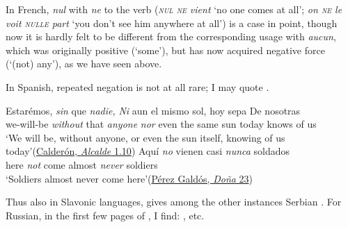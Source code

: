 In French, \textit{nul} with \textit{ne} to the verb (\textit{\textsc{nul ne} vient} `no one comes at all'; \textit{on \textsc{ne} le voit \textsc{nulle} part} `you don't see him anywhere at all') is a case in point, though now it is hardly felt to be different from the corresponding usage with \textit{aucun}, which was originally positive (`some'), but has now acquired negative force (`(not) any'), as we have seen above.

In Spanish, repeated negation is not at all rare; I may quote .

\ea \label{ex:07-26}
\ea{}
\gll Estarémos, \emph{sin} que \emph{nadie,} \emph{Ni} aun el mismo sol, hoy sepa De nosotras\\ %
 we-will-be \emph{without} that \emph{anyone} \emph{nor} even the same sun today knows of us\\
\glt `We will be, without anyone, or even the sun itself, knowing of us today'\hfill(\href{https://archive.org/details/AGuichot05012/page/30/mode/2up?q=%22Estar%C3%A9mos%22&view=theater}{Calderón, \textit{Alcalde} 1.10})
\ex {}
\gll Aquí \emph{no} vienen casi \emph{nunca} soldados\\
 here \emph{not} come almost \emph{never} soldiers\\
\glt `Soldiers almost never come here'\hfill(\href{https://archive.org/details/Donaperfecta/page/n27/mode/2up?q=%22aqui+no+vienen%22&view=theater}{Pérez Galdós, \textit{Doña} 23}) %
\z
\z

Thus also in Slavonic languages, \citet[\href{https://archive.org/details/grundrissderver01delbgoog/page/526/mode/2up?view=theater&q=\%22serbische+Beispiele\%22}{526}]{delbruck1897vergleichende} gives among the other instances Serbian . For Russian, in the first few pages of \citet[\href{https://archive.org/details/manuelpourltuded00boye/page/n13/mode/2up?view=theater}{3f}]{boyer1905manuel}, I find: , etc. %

